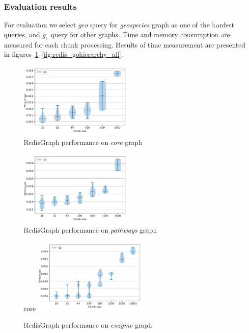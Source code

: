\subsubsection{Evaluation results}

For evaluation we select $geo$ query for \textit{geospecies} graph as one of the hardest queries, and $g_1$ query for other graphs.
Time and memory consumption are measured for each chunk processing.
Results of time measurement are presented in figures~\ref{fig:redis_core_all}--\ref{fig:redis_gohierarchy_all}.

\begin{figure}[h]
\centering
\includegraphics[width=0.5\textwidth]{data/raw_redis/core.pdf}
\caption{RedisGraph performance on \textit{core} graph}
\label{fig:redis_core_all}
\end{figure}


\begin{figure}[h]
\centering
\includegraphics[width=0.5\textwidth]{data/raw_redis/pathways.pdf}
\caption{RedisGraph performance on \textit{pathways} graph}
\label{fig:redis_pathways_all}
\end{figure}

\begin{figure}[h]core
\centering
\includegraphics[width=0.5\textwidth]{data/raw_redis/enzyme.pdf}
\caption{RedisGraph performance on \textit{enzyme} graph}
\label{fig:redis_enzyme_all}
\end{figure}


